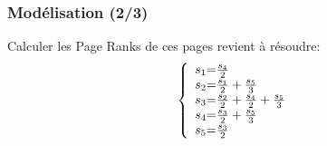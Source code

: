 \documentclass{beamer}
\begin{document}
\begin{frame}
  \frametitle{Modélisation (2/3)}
  
  Calculer les Page Ranks de ces pages revient à résoudre:\\
  \[ \left \{
    \begin{array}{ c @{ = } l }
      s_1 & \frac{s_4}{2}\\
      s_2 & \frac{s_1}{2} + \frac{s_5}{3}\\
      s_3 & \frac{s_2}{2} + \frac{s_4}{2} + \frac{s_5}{3}\\
      s_4 & \frac{s_3}{2} + \frac{s_5}{3}\\
      s_5 & \frac{s_3}{2}\\
    \end{array}
  \right. \]

\end{frame}
\end{document}
